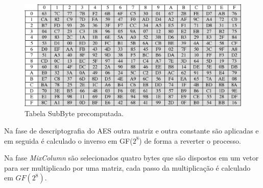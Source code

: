 \begin{figure}[!htp]
  \centering
    \includegraphics[width=\textwidth]{imagens/aes-subbyte.jpg}
  \caption{Tabela SubByte precomputada.}
  \label{fig:subbyte}
\end{figure}

Na fase de descriptografia do AES outra matriz e outra constante são aplicadas e em seguida é calculado o inverso em GF($2^8$) de forma a reverter o processo.

Na fase {\em MixColumn} são selecionados quatro bytes que são dispostos em um vetor para ser multiplicado por uma matriz, cada passo da multiplicação é calculado em $GF(2^8)$.


